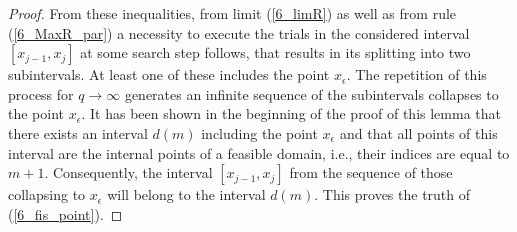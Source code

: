 \begin{proof}
From these inequalities, from limit (\ref{6_limR}) as well as from rule (\ref{6_MaxR_par}) a necessity to execute the trials in the considered interval $[x_{j-1},x_j]$ at some search step follows, that results in its splitting into two subintervals. At least one of these includes the point $x_\epsilon$. The repetition of this process for $q\rightarrow \infty$ generates an infinite sequence of the subintervals collapses to the point $x_\epsilon$. It has been shown in the beginning of the proof of this lemma that there exists an interval $d(m)$ including the point $x_\epsilon$ and that all points of this interval are the internal points of a feasible domain, i.e., their indices are equal to $m+1$. Consequently, the interval $[x_{j-1},x_j]$ from the sequence of those collapsing to $x_\epsilon$ will belong to the interval $d(m)$. This proves the truth of (\ref{6_fis_point}).
\end{proof}

